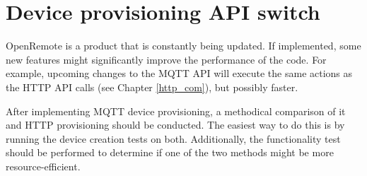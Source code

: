\section{Device provisioning API switch}
OpenRemote is a product that is constantly being updated. If implemented, some new features might significantly improve the performance of the code. For example, upcoming changes to the MQTT API \cite{mqtt_api_update} will execute the same actions as the HTTP API calls (see Chapter \ref{http_com}), but possibly faster.

After implementing MQTT device provisioning, a methodical comparison of it and HTTP provisioning should be conducted. The easiest way to do this is by running the device creation tests on both. Additionally, the functionality test should be performed to determine if one of the two methods might be more resource-efficient. 
